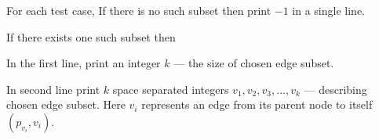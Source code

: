 For each test case,
If there is no such subset then print $-1$ in a single line.

If there exists one such subset then

In the first line, print an integer $k$ --- the size of chosen edge subset. 

In second line print $k$ space separated integers $v_1, v_2, v_3, \ldots, v_k$ --- describing chosen edge subset. Here $v_i$ represents an edge from its parent node to itself $(p_{v_i}, v_i)$. 

